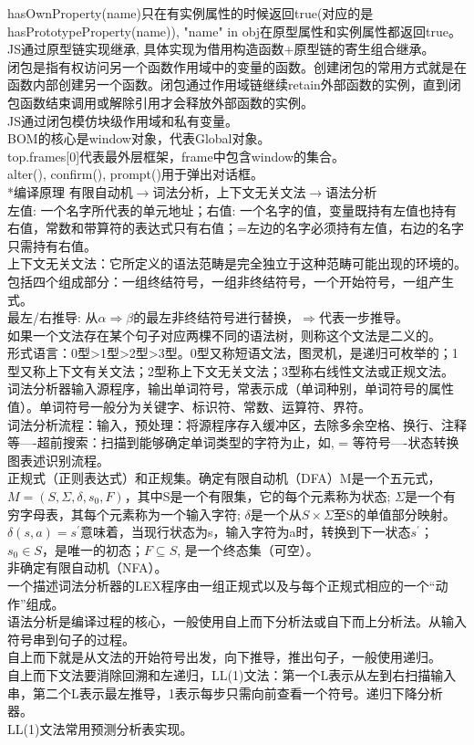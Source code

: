 \documentclass[UTF8]{ctexart}
\makeatletter
\renewcommand{\section}{\@startsection{section}{1}{0mm}
  {-\baselineskip}{0.5\baselineskip}{\bf\leftline}}
\makeatother
\begin{document}
hasOwnProperty(name)只在有实例属性的时候返回true(对应的是hasPrototypeProperty(name)), "name" in obj在原型属性和实例属性都返回true。\\
JS通过原型链实现继承, 具体实现为借用构造函数+原型链的寄生组合继承。\\
闭包是指有权访问另一个函数作用域中的变量的函数。创建闭包的常用方式就是在函数内部创建另一个函数。闭包通过作用域链继续retain外部函数的实例，直到闭包函数结束调用或解除引用才会释放外部函数的实例。\\
JS通过闭包模仿块级作用域和私有变量。\\
BOM的核心是window对象，代表Global对象。\\
top.frames[0]代表最外层框架，frame中包含window的集合。\\
alter(), confirm(), prompt()用于弹出对话框。\\
\section*{编译原理}
\noindent 有限自动机$\rightarrow$词法分析，上下文无关文法$\rightarrow$语法分析\\
左值: 一个名字所代表的单元地址；右值: 一个名字的值，变量既持有左值也持有右值，常数和带算符的表达式只有右值；=左边的名字必须持有左值，右边的名字只需持有右值。\\
上下文无关文法：它所定义的语法范畴是完全独立于这种范畴可能出现的环境的。包括四个组成部分：一组终结符号，一组非终结符号，一个开始符号，一组产生式。\\
最左/右推导: 从$\alpha\Rightarrow\beta$的最左非终结符号进行替换，$\Rightarrow$代表一步推导。\\
如果一个文法存在某个句子对应两棵不同的语法树，则称这个文法是二义的。\\
形式语言：0型>1型>2型>3型。0型又称短语文法，图灵机，是递归可枚举的；1型又称上下文有关文法；2型称上下文无关文法；3型称右线性文法或正规文法。\\
词法分析器输入源程序，输出单词符号，常表示成（单词种别，单词符号的属性值）。单词符号一般分为关键字、标识符、常数、运算符、界符。\\
词法分析流程：输入，预处理：将源程序存入缓冲区，去除多余空格、换行、注释等----超前搜索：扫描到能够确定单词类型的字符为止，如, = 等符号----状态转换图表述识别流程。\\
正规式（正则表达式）和正规集。确定有限自动机（DFA）M是一个五元式，$M=(S,\Sigma,\delta,s_0,F)$，其中S是一个有限集，它的每个元素称为状态; $\Sigma$是一个有穷字母表，其每个元素称为一个输入字符; $\delta$是一个从$S\times \Sigma$至S的单值部分映射。$\delta(s,a)=s^{'}$意味着，当现行状态为s，输入字符为a时，转换到下一状态$s^{'}$；$s_0\in S$，是唯一的初态；$F\subseteq S$, 是一个终态集（可空）。\\
非确定有限自动机（NFA）。\\
一个描述词法分析器的LEX程序由一组正规式以及与每个正规式相应的一个“动作”组成。\\
语法分析是编译过程的核心，一般使用自上而下分析法或自下而上分析法。从输入符号串到句子的过程。\\
自上而下就是从文法的开始符号出发，向下推导，推出句子，一般使用递归。\\
自上而下文法要消除回溯和左递归，LL(1)文法：第一个L表示从左到右扫描输入串，第二个L表示最左推导，1表示每步只需向前查看一个符号。递归下降分析器。\\
LL(1)文法常用预测分析表实现。
\end{document}
